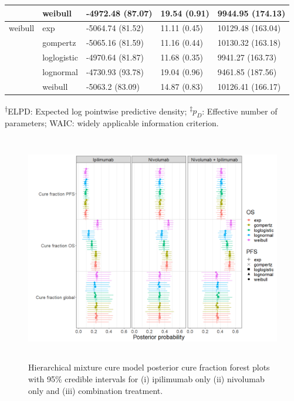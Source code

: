 \documentclass[AMA,STIX1COL]{WileyNJD-v2}
\begin{document}
\begin{table}[!ht]
\begin{tabular}{l|l|l|l|l}
\hline
 & weibull & -4972.48 (87.07) & 19.54 (0.91) & 9944.95 (174.13)\\
\hline
weibull & exp & -5064.74 (81.52) & 11.11 (0.45) & 10129.48 (163.04)\\
\hline
 & gompertz & -5065.16 (81.59) & 11.16 (0.44) & 10130.32 (163.18)\\
\hline
 & loglogistic & -4970.64 (81.87) & 11.68 (0.35) & 9941.27 (163.73)\\
\hline
 & lognormal & -4730.93 (93.78) & 19.04 (0.96) & 9461.85 (187.56)\\
\hline
 & weibull & -5063.2 (83.09) & 14.87 (0.83) & 10126.41 (166.17)\\
\hline
\end{tabular}
\begin{tablenotes}%
\textsuperscript{$\dagger$}ELPD: Expected log pointwise predictive density;
\textsuperscript{$\ddagger$}$p_D$: Effective number of parameters;
WAIC: widely applicable information criterion.
\end{tablenotes}
\end{table}

\begin{figure}[hbt!]
\centering
\includegraphics[height=10cm, width=0.9\linewidth]{forest_plot_multimcm.png}
\caption{\label{fig:cf_forest_all_tx} Hierarchical mixture cure model posterior cure fraction forest plots with 95\% credible intervals for (i) ipilimumab only (ii) nivolumab only and (iii) combination treatment.}
\end{figure}
\end{document}
